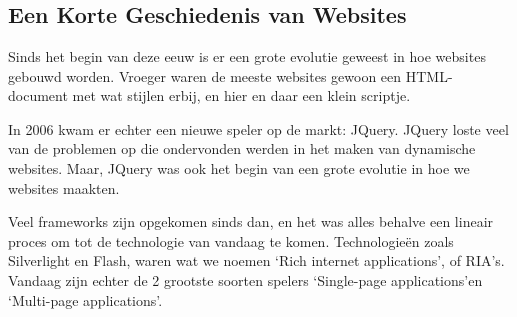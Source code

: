 
\chapter{}
\label{ch:inleiding}



\section{Een Korte Geschiedenis van Websites}

Sinds het begin van deze eeuw is er een grote evolutie geweest in hoe websites gebouwd worden. Vroeger waren de meeste websites gewoon een HTML-document met wat stijlen erbij, en hier en daar een klein scriptje. 

In 2006 kwam er echter een nieuwe speler op de markt: JQuery. JQuery loste veel van de problemen op die ondervonden werden in het maken van dynamische websites. Maar, JQuery was ook het begin van een grote evolutie in hoe we websites maakten.

Veel frameworks zijn opgekomen sinds dan, en het was alles behalve een lineair proces om tot de technologie van vandaag te komen. Technologieën zoals Silverlight en Flash, waren wat we noemen \lq Rich internet applications\rq, of RIA's. Vandaag zijn echter de 2 grootste soorten spelers \lq Single-page applications\rq en \lq Multi-page applications\rq.


